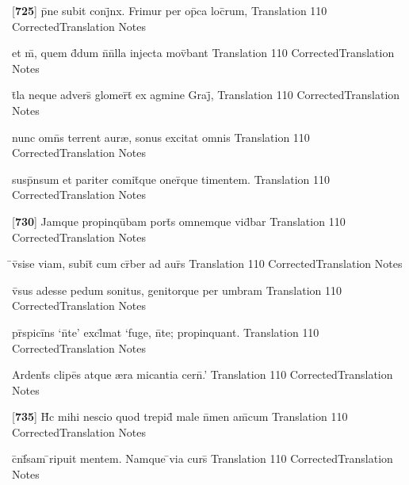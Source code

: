 \latline
  {[\textbf{725}] p\={}ne subit conj\={}nx.  Frimur per op\={}ca loc\={}rum,}
  { Translation }
  {110}
  { CorrectedTranslation }
  { Notes }


\latline
  {et m\={}, quem d\={}dum n\={}n\={}lla injecta mov\={}bant}
  { Translation }
  {110}
  { CorrectedTranslation }
  { Notes }


\latline
  {t\={}la neque advers\={} glomer\={}t\={\macron {\i}} ex agmine Graj\={\macron {\i}},}
  { Translation }
  {110}
  { CorrectedTranslation }
  { Notes }


\latline
  {nunc omn\={}s terrent aur{\ae}, sonus excitat omnis}
  { Translation }
  {110}
  { CorrectedTranslation }
  { Notes }


\latline
  {susp\={}nsum et pariter comit\={\macron {\i}}que oner\={\macron {\i}}que timentem.}
  { Translation }
  {110}
  { CorrectedTranslation }
  { Notes }


\latline
  {[\textbf{730}] Jamque propinqu\={}bam port\={\macron {\i}}s omnemque vid\={}bar}
  { Translation }
  {110}
  { CorrectedTranslation }
  { Notes }


\latline
  {\={}v\={}sise viam, subit\={} cum cr\={}ber ad aur\={\macron {\i}}s}
  { Translation }
  {110}
  { CorrectedTranslation }
  { Notes }


\latline
  {v\={\macron {\i}}sus adesse pedum sonitus, genitorque per umbram}
  { Translation }
  {110}
  { CorrectedTranslation }
  { Notes }


\latline
  {pr\={}spici\={}ns `n\={}te' excl\={}mat `fuge, n\={}te; propinquant.}
  { Translation }
  {110}
  { CorrectedTranslation }
  { Notes }


\latline
  {Ardent\={\macron {\i}}s clipe\={}s atque {\ae}ra micantia cern\={}.'}
  { Translation }
  {110}
  { CorrectedTranslation }
  { Notes }


\latline
  {[\textbf{735}] H\={\macron {\i}}c mihi nescio quod trepid\={} male n\={}men am\={\macron {\i}}cum}
  { Translation }
  {110}
  { CorrectedTranslation }
  { Notes }


\latline
  {c\={}nf\={}sam \={}ripuit mentem.  Namque \={}via curs\={}}
  { Translation }
  {110}
  { CorrectedTranslation }
  { Notes }


